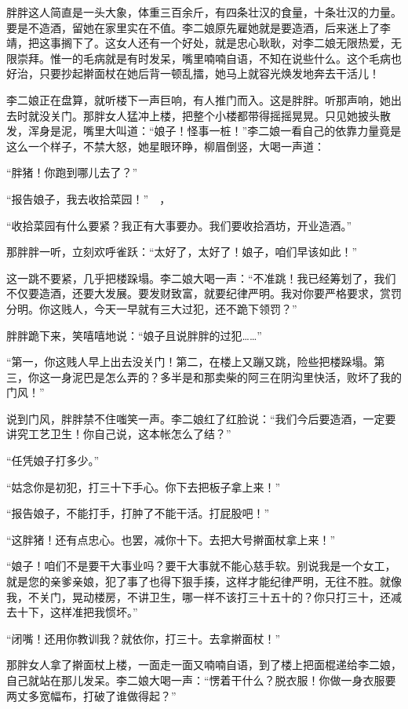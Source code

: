 胖胖这人简直是一头大象，体重三百余斤，有四条壮汉的食量，十条壮汉的力量。要是不造酒，留她在家里实在不值。李二娘原先雇她就是要造酒，后来迷上了李靖，把这事搁下了。这女人还有一个好处，就是忠心耿耿，对李二娘无限热爱，无限崇拜。惟一的毛病就是有时发呆，嘴里喃喃自语，不知在说些什么。这个毛病也好治，只要抄起擀面杖在她后背一顿乱擂，她马上就容光焕发地奔去干活儿！

李二娘正在盘算，就听楼下一声巨响，有人推门而入。这是胖胖。听那声响，她出去时就没关门。那胖女人猛冲上楼，把整个小楼都带得摇摇晃晃。只见她披头散发，浑身是泥，嘴里大叫道：“娘子！怪事一桩！”李二娘一看自己的依靠力量竟是这么一个样子，不禁大怒，她星眼环睁，柳眉倒竖，大喝一声道：

“胖猪！你跑到哪儿去了？”　

“报告娘子，我去收拾菜园！”　，

“收拾菜园有什么要紧？我正有大事要办。我们要收拾酒坊，开业造酒。”

那胖胖一听，立刻欢呼雀跃：“太好了，太好了！娘子，咱们早该如此！”

这一跳不要紧，几乎把楼跺塌。李二娘大喝一声：“不准跳！我已经筹划了，我们不仅要造酒，还要大发展。要发财致富，就要纪律严明。我对你要严格要求，赏罚分明。你这贱人，今天一早就有三大过犯，还不跪下领罚？”

胖胖跪下来，笑嘻嘻地说：“娘子且说胖胖的过犯……”

“第一，你这贱人早上出去没关门！第二，在楼上又蹦又跳，险些把楼跺塌。第三，你这一身泥巴是怎么弄的？多半是和那卖柴的阿三在阴沟里快活，败坏了我的门风！”

说到门风，胖胖禁不住嗤笑一声。李二娘红了红脸说：“我们今后要造酒，一定要讲究工艺卫生！你自己说，这本帐怎么了结？”

“任凭娘子打多少。”

“姑念你是初犯，打三十下手心。你下去把板子拿上来！”

“报告娘子，不能打手，打肿了不能干活。打屁股吧！”

“这胖猪！还有点忠心。也罢，减你十下。去把大号擀面杖拿上来！”

“娘子！咱们不是要干大事业吗？要干大事就不能心慈手软。别说我是一个女工，就是您的亲爹亲娘，犯了事了也得下狠手揍，这样才能纪律严明，无往不胜。就像我，不关门，晃动楼房，不讲卫生，哪一样不该打三十五十的？你只打三十，还减去十下，这样准把我惯坏。”

“闭嘴！还用你教训我？就依你，打三十。去拿擀面杖！”

那胖女人拿了擀面杖上楼，一面走一面又喃喃自语，到了楼上把面棍递给李二娘，自己就站在那儿发呆。李二娘大喝一声：“愣着干什么？脱衣服！你做一身衣服要两丈多宽幅布，打破了谁做得起？”


